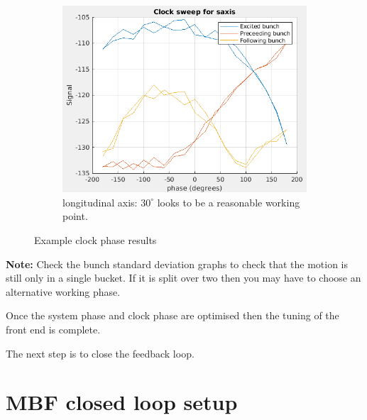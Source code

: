 \documentclass{report}
\begin{document}
\begin{figure}[hbt]
    \begin{subfigure}[b]{0.45\textwidth}
        \includegraphics[width=\textwidth]{vlr_clock_phase_scan_s.png}
        \caption{longitudinal axis: $30^\circ$ looks to be a reasonable working point.}
        \label{fig:frontend_clock_phase_scan_z}
    \end{subfigure}
    \caption{Example clock phase results}
    \label{fig:frontend_clock_phase_scan}
\end{figure}

\begin{tcolorbox}
\textbf{Note:} Check the bunch standard deviation graphs to check that the motion is still only in a single bucket. If it is split over two then you may have to choose an alternative working phase.
\end{tcolorbox}

Once the system phase and clock phase are optimised then the tuning of the front end is complete.

The next step is to close the feedback loop.
\clearpage
\section{MBF closed loop setup}
\end{document}
